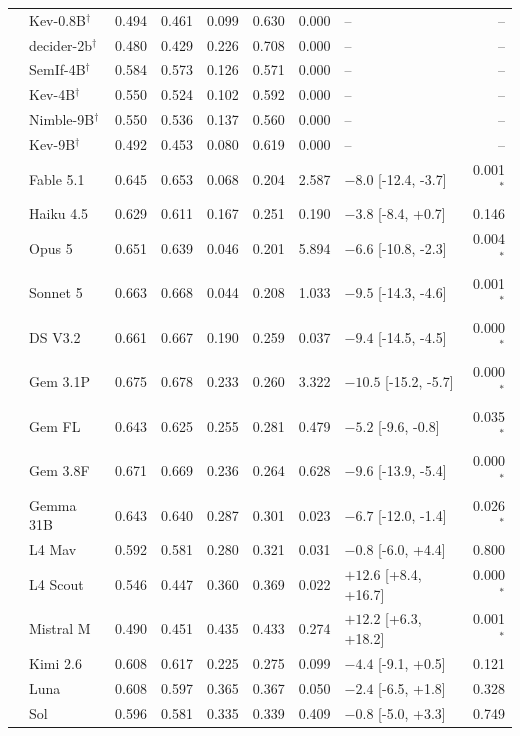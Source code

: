 \begin{longtable}{llrrrrrlr}
 & Kev-0.8B$^{\dagger}$ & 0.494 & 0.461 & 0.099 & 0.630 & 0.000 & -- & -- \\
 & decider-2b$^{\dagger}$ & 0.480 & 0.429 & 0.226 & 0.708 & 0.000 & -- & -- \\
 & SemIf-4B$^{\dagger}$ & 0.584 & 0.573 & 0.126 & 0.571 & 0.000 & -- & -- \\
 & Kev-4B$^{\dagger}$ & 0.550 & 0.524 & 0.102 & 0.592 & 0.000 & -- & -- \\
 & Nimble-9B$^{\dagger}$ & 0.550 & 0.536 & 0.137 & 0.560 & 0.000 & -- & -- \\
 & Kev-9B$^{\dagger}$ & 0.492 & 0.453 & 0.080 & 0.619 & 0.000 & -- & -- \\
 & Fable 5.1 & 0.645 & 0.653 & 0.068 & 0.204 & 2.587 & $-8.0$ [-12.4, -3.7] & 0.001$^{*}$ \\
 & Haiku 4.5 & 0.629 & 0.611 & 0.167 & 0.251 & 0.190 & $-3.8$ [-8.4, +0.7] & 0.146 \\
 & Opus 5 & 0.651 & 0.639 & 0.046 & 0.201 & 5.894 & $-6.6$ [-10.8, -2.3] & 0.004$^{*}$ \\
 & Sonnet 5 & 0.663 & 0.668 & 0.044 & 0.208 & 1.033 & $-9.5$ [-14.3, -4.6] & 0.001$^{*}$ \\
 & DS V3.2 & 0.661 & 0.667 & 0.190 & 0.259 & 0.037 & $-9.4$ [-14.5, -4.5] & 0.000$^{*}$ \\
 & Gem 3.1P & 0.675 & 0.678 & 0.233 & 0.260 & 3.322 & $-10.5$ [-15.2, -5.7] & 0.000$^{*}$ \\
 & Gem FL & 0.643 & 0.625 & 0.255 & 0.281 & 0.479 & $-5.2$ [-9.6, -0.8] & 0.035$^{*}$ \\
 & Gem 3.8F & 0.671 & 0.669 & 0.236 & 0.264 & 0.628 & $-9.6$ [-13.9, -5.4] & 0.000$^{*}$ \\
 & Gemma 31B & 0.643 & 0.640 & 0.287 & 0.301 & 0.023 & $-6.7$ [-12.0, -1.4] & 0.026$^{*}$ \\
 & L4 Mav & 0.592 & 0.581 & 0.280 & 0.321 & 0.031 & $-0.8$ [-6.0, +4.4] & 0.800 \\
 & L4 Scout & 0.546 & 0.447 & 0.360 & 0.369 & 0.022 & $+12.6$ [+8.4, +16.7] & 0.000$^{*}$ \\
 & Mistral M & 0.490 & 0.451 & 0.435 & 0.433 & 0.274 & $+12.2$ [+6.3, +18.2] & 0.001$^{*}$ \\
 & Kimi 2.6 & 0.608 & 0.617 & 0.225 & 0.275 & 0.099 & $-4.4$ [-9.1, +0.5] & 0.121 \\
 & Luna & 0.608 & 0.597 & 0.365 & 0.367 & 0.050 & $-2.4$ [-6.5, +1.8] & 0.328 \\
 & Sol & 0.596 & 0.581 & 0.335 & 0.339 & 0.409 & $-0.8$ [-5.0, +3.3] & 0.749 \\

\end{longtable}
